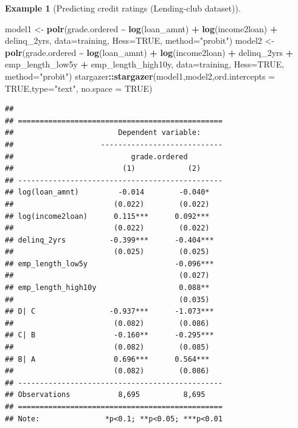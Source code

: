 \documentclass[
  12pt,
]{book}
\newenvironment{Shaded}{\begin{snugshade}}{\end{snugshade}}
\newcommand{\AttributeTok}[1]{\textcolor[rgb]{0.13,0.29,0.53}{#1}}
\newcommand{\ConstantTok}[1]{\textcolor[rgb]{0.56,0.35,0.01}{#1}}
\newcommand{\FunctionTok}[1]{\textcolor[rgb]{0.13,0.29,0.53}{\textbf{#1}}}
\newcommand{\NormalTok}[1]{#1}
\newcommand{\OtherTok}[1]{\textcolor[rgb]{0.56,0.35,0.01}{#1}}
\newcommand{\SpecialCharTok}[1]{\textcolor[rgb]{0.81,0.36,0.00}{\textbf{#1}}}
\newcommand{\StringTok}[1]{\textcolor[rgb]{0.31,0.60,0.02}{#1}}
\theoremstyle{definition}
\theoremstyle{definition}
\newtheorem{example}{Example}[chapter]
\theoremstyle{definition}
\theoremstyle{definition}
\theoremstyle{remark}
\begin{document}
\begin{example}[Predicting credit ratings (Lending-club dataset)]
\begin{Shaded}
\begin{Highlighting}[]
\NormalTok{model1 }\OtherTok{\textless{}{-}} \FunctionTok{polr}\NormalTok{(grade.ordered }\SpecialCharTok{\textasciitilde{}} \FunctionTok{log}\NormalTok{(loan\_amnt) }\SpecialCharTok{+} \FunctionTok{log}\NormalTok{(income2loan) }\SpecialCharTok{+}\NormalTok{ delinq\_2yrs,}
               \AttributeTok{data=}\NormalTok{training, }\AttributeTok{Hess=}\ConstantTok{TRUE}\NormalTok{, }\AttributeTok{method=}\StringTok{"probit"}\NormalTok{)}
\NormalTok{model2 }\OtherTok{\textless{}{-}} \FunctionTok{polr}\NormalTok{(grade.ordered }\SpecialCharTok{\textasciitilde{}} \FunctionTok{log}\NormalTok{(loan\_amnt) }\SpecialCharTok{+} \FunctionTok{log}\NormalTok{(income2loan) }\SpecialCharTok{+}\NormalTok{ delinq\_2yrs }\SpecialCharTok{+}
\NormalTok{                 emp\_length\_low5y }\SpecialCharTok{+}\NormalTok{ emp\_length\_high10y,}
               \AttributeTok{data=}\NormalTok{training, }\AttributeTok{Hess=}\ConstantTok{TRUE}\NormalTok{, }\AttributeTok{method=}\StringTok{"probit"}\NormalTok{)}
\NormalTok{stargazer}\SpecialCharTok{::}\FunctionTok{stargazer}\NormalTok{(model1,model2,}\AttributeTok{ord.intercepts =} \ConstantTok{TRUE}\NormalTok{,}\AttributeTok{type=}\StringTok{"text"}\NormalTok{,}
                     \AttributeTok{no.space =} \ConstantTok{TRUE}\NormalTok{)}
\end{Highlighting}
\end{Shaded}

\begin{verbatim}
## 
## ===============================================
##                        Dependent variable:     
##                    ----------------------------
##                           grade.ordered        
##                         (1)            (2)     
## -----------------------------------------------
## log(loan_amnt)         -0.014        -0.040*   
##                       (0.022)        (0.022)   
## log(income2loan)      0.115***      0.092***   
##                       (0.022)        (0.022)   
## delinq_2yrs          -0.399***      -0.404***  
##                       (0.025)        (0.025)   
## emp_length_low5y                    -0.096***  
##                                      (0.027)   
## emp_length_high10y                   0.088**   
##                                      (0.035)   
## D| C                 -0.937***      -1.073***  
##                       (0.082)        (0.086)   
## C| B                  -0.160**      -0.295***  
##                       (0.082)        (0.085)   
## B| A                  0.696***      0.564***   
##                       (0.082)        (0.086)   
## -----------------------------------------------
## Observations           8,695          8,695    
## ===============================================
## Note:               *p<0.1; **p<0.05; ***p<0.01
\end{verbatim}


\end{example}
\end{document}
